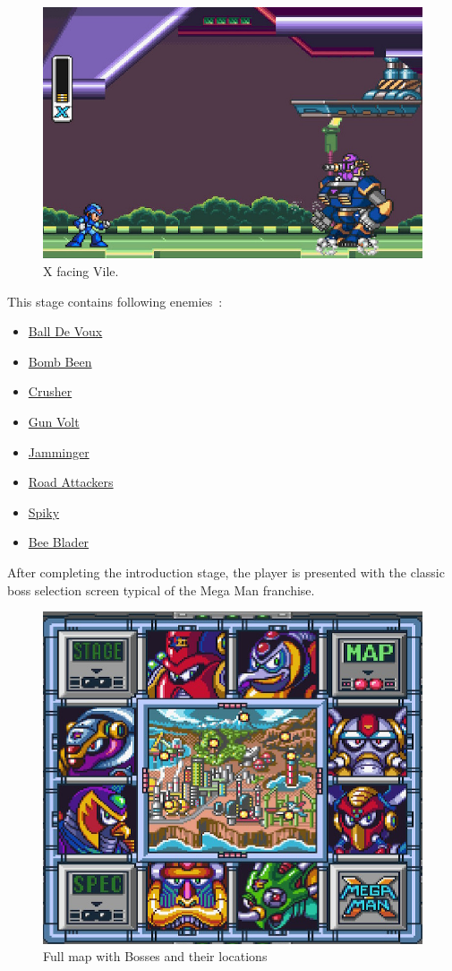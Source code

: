 \begin{figure}[htp]
	\centering
	\includegraphics[width=0.5\linewidth]{figures/X1/Highway_screenshot.jpg}
	\caption{X facing Vile.}
\end{figure}

This stage contains following enemies~\cite{wiki:Highway}:
\begin{itemize}
	\item \hyperlink{enem:Ball_De_Voux}{Ball De Voux}
	\item \hyperlink{enem:Bomb_Been}{Bomb Been}
	\item \hyperlink{enem:Crusher}{Crusher}
	\item \hyperlink{enem:Gun_Volt}{Gun Volt}
	\item \hyperlink{enem:Jamminger}{Jamminger}
	\item \hyperlink{enem:Road_Attackers}{Road Attackers}
	\item \hyperlink{enem:Spiky}{Spiky }
	\item \hyperlink{miniboss:Bee_Blader}{Bee Blader }
\end{itemize}

After completing the introduction stage, the player is presented with the classic boss selection screen typical of the Mega Man franchise. 

\begin{figure}[htp]
	\centering
	\includegraphics[width=0.5\linewidth]{figures/X1/Full_map.png}
	\caption{Full map with Bosses and their locations}
\end{figure}




